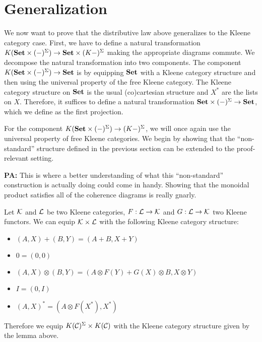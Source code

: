 \documentclass[acmsmall,anonymous,review,screen]{acmart}
\newcommand{\cat}[1]{
  \relax
  \StrLen{#1}[\arglength]
  \ifnum\arglength=1
  \mathcal{#1}
  \else
  \mathbf{#1}
  \fi
}
\newcommand\makenote[4]{\par\noindent\begin{tcolorbox}
[size=small,colback=#2]\color{#3}\textbf{#4: }#1\end{tcolorbox}\noindent}
\newcommand\pa[1]{\makenote{#1}{cornellred}{white}{PA}}
\newcommand{\Set}{\cat{Set}}
\begin{document}
\section{Generalization}

We now want to prove that the distributive law above generalizes to
the Kleene category case. First, we have to define a natural
transformation $K(\Set \times (-)^\Sigma) \to \Set \times (K -
)^\Sigma$ making the appropriate diagrams commute. We decompose the
natural transformation into two components.  The component $K(\Set
\times (-)^\Sigma) \to \Set$ is by equipping $\Set$ with a Kleene
category structure and then using the universal property of the free
Kleene category. The Kleene category structure on $\Set$ is the usual
(co)cartesian structure and $X^*$ are the lists on $X$. Therefore, it
suffices to define a natural transformation $\Set \times (-)^\Sigma \to \Set$,
which we define as the first projection.

For the component $K(\Set \times (-)^\Sigma) \to (K - )^\Sigma$,
we will once again use the universal property of free Kleene
categories. We begin by showing that the ``non-standard''
structure defined in the previous section can be extended to the
proof-relevant setting.

\pa{This is where a better understanding of what this ``non-standard''
  construction is actually doing could come in handy. Showing that the
  monoidal product satisfies all of the coherence diagrams is really gnarly.}
\begin{lemma}
  Let $\cat{K}$ and $\cat{L}$ be two Kleene categories, $F : \cat{L} \to \cat{K}$
  and $G : \cat{L} \to \cat{K}$ two Kleene functors.
  We can equip $\cat{K} \times \cat{L}$ with the following Kleene
  category structure:
  \begin{itemize}
  \item $(A, X) + (B, Y) = (A + B, X + Y)$
  \item $0 = (0, 0)$
  \item $(A, X) \otimes (B, Y) = (A \otimes F(Y) + G(X) \otimes B, X \otimes Y)$
  \item $I = (0, I)$
  \item $(A, X)^* = (A \otimes F(X^*), X^*)$
  \end{itemize}
\end{lemma}

Therefore we equip $K(\cat{C})^\Sigma \times K(\cat{C})$ with the
Kleene category structure given by the lemma above.
\end{document}
